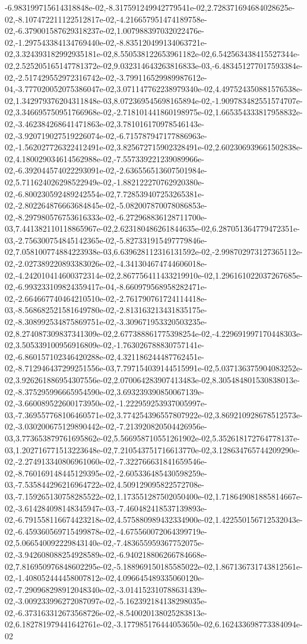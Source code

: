 -6.983199715614318848e-02,-8.317591249942779541e-02,2.728371694684028625e-02,-8.107472211122512817e-02,-4.216657951474189758e-02,-6.379001587629318237e-02,1.007988397032022476e-02,-1.297543384134769440e-02,-8.835120499134063721e-02,3.324393182992935181e-02,8.550538122653961182e-02,6.542563438415527344e-02,2.525205165147781372e-02,9.032314643263816833e-03,-6.483451277017593384e-02,-2.517429552972316742e-02,-3.799116529989987612e-04,-3.777020052075386047e-02,3.071147762238979340e-02,4.497524350881576538e-02,1.342979376204311848e-03,8.072369545698165894e-02,-1.909783482551574707e-02,3.346695750951766968e-02,-2.718101441860198975e-02,1.665354333817958832e-02,-3.462384268641471863e-02,3.781016170978546143e-02,-3.920719027519226074e-02,-6.715787947177886963e-02,-1.562027726322412491e-02,3.825672715902328491e-02,2.602306939661502838e-02,4.180029034614562988e-02,-7.557339221239089966e-02,-6.392044574022293091e-02,-2.636556513607501984e-02,5.711624026298522949e-02,-1.882122270762920380e-02,-6.800230592489242554e-02,7.728539407253265381e-02,-2.802264876663684845e-02,-5.082007870078086853e-02,-8.297980576753616333e-02,-6.272968836128711700e-03,7.441382110118865967e-02,2.623180486261844635e-02,6.287051364779472351e-03,-2.756300754845142365e-02,-5.827331915497779846e-02,7.058100774884223938e-03,6.639628112316131592e-02,-2.998702973127365112e-02,-2.027389220893383026e-02,-4.341304674744606018e-02,-4.242010414600372314e-02,2.867756411433219910e-02,1.296161022037267685e-02,-6.993233109824359417e-04,-8.660979568958282471e-02,-2.664667740464210510e-02,-2.761790761724114418e-03,-8.568682521581649780e-02,-2.813163213431835175e-02,-8.308992534875869751e-02,-3.309671953320503235e-02,8.274087309837341309e-02,2.677388861775398254e-02,-4.229691997170448303e-02,3.505339100956916809e-02,-1.763026788830757141e-02,-6.860157102346420288e-02,4.321186244487762451e-02,-8.712946437299251556e-03,7.797154039144515991e-02,5.037136375904083252e-02,3.926261886954307556e-02,2.070064283907413483e-02,8.305484801530838013e-02,-8.375295996665954590e-02,3.693239390850067139e-02,-3.660089522600173950e-02,-1.222959253937005997e-03,-7.369557768106460571e-02,3.774254396557807922e-02,3.869210928678512573e-02,-3.030200675129890442e-02,-7.213920820504426956e-03,3.773653879761695862e-02,5.566958710551261902e-02,5.352618172764778137e-03,1.202716771513223648e-02,7.210543751716613770e-02,3.128634765744209290e-02,-2.274913340806961060e-02,-7.322766631841659546e-02,-8.760169148445129395e-02,-2.605336485430598259e-03,-7.535844296216964722e-02,4.509129095822572708e-03,-7.159265130758285522e-02,1.173551287502050400e-02,1.718649081885814667e-02,-3.614284098148345947e-03,-7.460482418537139893e-02,-6.791558116674423218e-02,4.575880989432334900e-02,1.422550156712532043e-02,-6.459360569715499878e-02,-4.675560072064399719e-02,5.066540092229843140e-02,-7.483655959367752075e-02,-3.942608088254928589e-02,-6.940218806266784668e-02,7.816950976848602295e-02,-5.188969150185585022e-02,1.867136731743812561e-02,-1.408052444458007812e-02,4.096645489335060120e-02,-7.290968298912048340e-02,-3.014152310788631439e-02,-3.009233996272087097e-02,-5.162392184138298035e-02,-6.373163312673568726e-02,-8.540020138025283813e-02,6.182781979441642761e-02,-3.177985176444053650e-02,6.162433698773384094e-02
